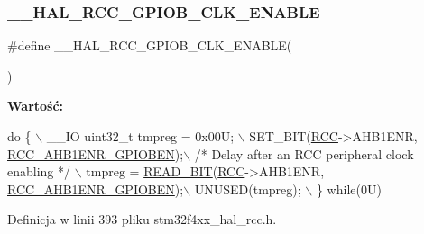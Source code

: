 \subsubsection{\texorpdfstring{\+\_\+\+\_\+\+H\+A\+L\+\_\+\+R\+C\+C\+\_\+\+G\+P\+I\+O\+B\+\_\+\+C\+L\+K\+\_\+\+E\+N\+A\+B\+LE}{\_\_HAL\_RCC\_GPIOB\_CLK\_ENABLE}}
{\footnotesize\ttfamily \#define \+\_\+\+\_\+\+H\+A\+L\+\_\+\+R\+C\+C\+\_\+\+G\+P\+I\+O\+B\+\_\+\+C\+L\+K\+\_\+\+E\+N\+A\+B\+LE(\begin{DoxyParamCaption}{ }\end{DoxyParamCaption})}

{\bfseries Wartość\+:}
\begin{DoxyCode}
\textcolor{keywordflow}{do} \{ \(\backslash\)
                                        \_\_IO uint32\_t tmpreg = 0x00U; \(\backslash\)
                                        SET\_BIT(\hyperlink{group___peripheral__declaration_ga74944438a086975793d26ae48d5882d4}{RCC}->AHB1ENR, 
      \hyperlink{group___peripheral___registers___bits___definition_gad7f408f92e7fd49b0957b8cb4ff31ca5}{RCC\_AHB1ENR\_GPIOBEN});\(\backslash\)
                                        \textcolor{comment}{/* Delay after an RCC peripheral clock enabling */} \(\backslash\)
                                        tmpreg = \hyperlink{group___exported__macro_ga822bb1bb9710d5f2fa6396b84e583c33}{READ\_BIT}(\hyperlink{group___peripheral__declaration_ga74944438a086975793d26ae48d5882d4}{RCC}->AHB1ENR, 
      \hyperlink{group___peripheral___registers___bits___definition_gad7f408f92e7fd49b0957b8cb4ff31ca5}{RCC\_AHB1ENR\_GPIOBEN});\(\backslash\)
                                        UNUSED(tmpreg); \(\backslash\)
                                          \} \textcolor{keywordflow}{while}(0U)
\end{DoxyCode}


Definicja w linii 393 pliku stm32f4xx\+\_\+hal\+\_\+rcc.\+h.

\mbox{\label{group___r_c_c___a_h_b1___clock___enable___disable_ga0fc90c25d35f9b5b5f66961505de1cd4}} 
